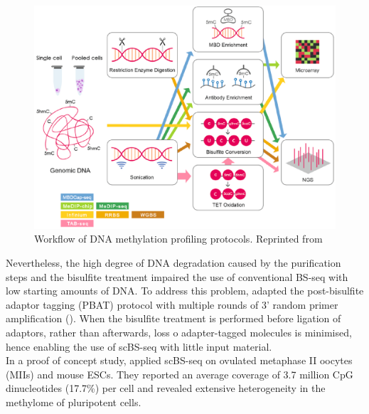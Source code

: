 \begin{figure}[H]
	\centering
	\includegraphics[width=0.8\linewidth]{methylation_protocols}
	\caption[]{Workflow of DNA methylation profiling protocols. Reprinted from \cite{Yong2016}}
	\label{fig:methylation_protocols}
\end{figure}

Nevertheless, the high degree of DNA degradation caused by the purification steps and the bisulfite treatment impaired the use of conventional BS-seq with low starting amounts of DNA. To address this problem, \cite{Smallwood2014} adapted the post-bisulfite adaptor tagging (PBAT) protocol with multiple rounds of 3' random primer amplification (). When the bisulfite treatment is performed before ligation of adaptors, rather than afterwards, loss o adapter-tagged molecules is minimised, hence enabling the use of scBS-seq with little input material.\\

In a proof of concept study, \cite{Smallwood2014} applied scBS-seq on ovulated metaphase II oocytes (MIIs) and mouse ESCs. They reported an average coverage of 3.7 million CpG dinucleotides (17.7\%) per cell and revealed extensive heterogeneity in the methylome of pluripotent cells. \\

